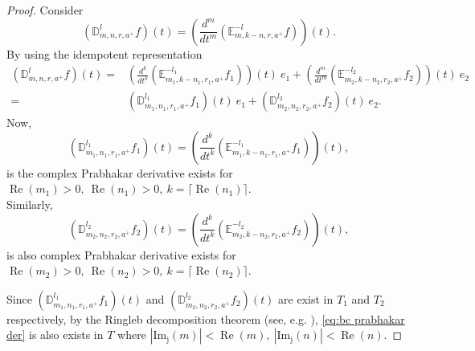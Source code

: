\documentclass[a4paper,12pt]{article}
\theoremstyle{remark}
\begin{document}
\begin{proof}
    Consider 
	\begin{equation}
	(\mathbb{D}_{m,n,r,a^+}^l f)(t)=\left(\frac{d^m}{dt^m}(\mathbb{E}_{m,k-n,r,a^+}^{-l}f) \right) (t).
	\end{equation}
	By using the idempotent representation
		\begin{equation}
	\begin{split}
		(\mathbb{D}_{m,n,r,a^+}^l f)(t)=&
	\left(\frac{d^k}{dt^k}(\mathbb{E}_{m_1,k-n_1,r_1,a^+}^{-l_1}f_1) \right) (t)~e_1+	\left(\frac{d^m}{dt^m}(\mathbb{E}_{m_2,k-n_2,r_2,a^+}^{-l_2}f_2) \right) (t)~e_2	\\
	=&(\mathbb{D}_{m_1,n_1,r_1,a^+}^{l_1} f_1)(t)~e_1+(\mathbb{D}_{m_2,n_2,r_2,a^+}^{l_2} f_2)(t)~e_2.
	\end{split}
	\end{equation}
	Now, 	\begin{equation}
(\mathbb{D}_{m_1,n_1,r_1,a^+}^{l_1}f_1)(t)=\left(\frac{d^k}{dt^k}(\mathbb{E}_{m_1,k-n_1,r_1,a^+}^{-l_1}f_1) \right) (t),
	\end{equation}
	is the complex Prabhakar derivative  \cite{polito2016some,garra2014hilfer} exists for $\operatorname{Re}(m_1)>0,~\operatorname{Re}(n_1)>0,~k=\lceil \operatorname{Re}(n_1)\rceil  .$ \\
	Similarly, 	
	\begin{equation}	(\mathbb{D}_{m_2,n_2,r_2,a^+}^{l_2} f_2)(t)=\left(\frac{d^k}{dt^k}(\mathbb{E}_{m_2,k-n_2,r_2,a^+}^{-l_2}f_2) \right) (t),\end{equation}	
	is also complex Prabhakar derivative exists for $\operatorname{Re}(m_2)>0,~\operatorname{Re}(n_2)>0,~k=\lceil \operatorname{Re}( n_2)\rceil. $ 
    
	Since $(\mathbb{D}_{m_1,n_1,r_1,a^+}^{l_1} f_1)(t)$ and $(\mathbb{D}_{m_2,n_2,r_2,a^+}^{l_2} f_2)(t)$ are exist in $T_1$ and $ T_2$ respectively, by the Ringleb
	decomposition theorem (see, e.g. \cite{ragarwal2022bicomplex}),  \eqref{eq:bc prabhakar der} is also exists in $T$ where $|\operatorname{Im_j}(m)|<\operatorname{Re}(m),~|\operatorname{Im_j}(n)|<\operatorname{Re}(n).$
     
\end{proof}
\end{document}
